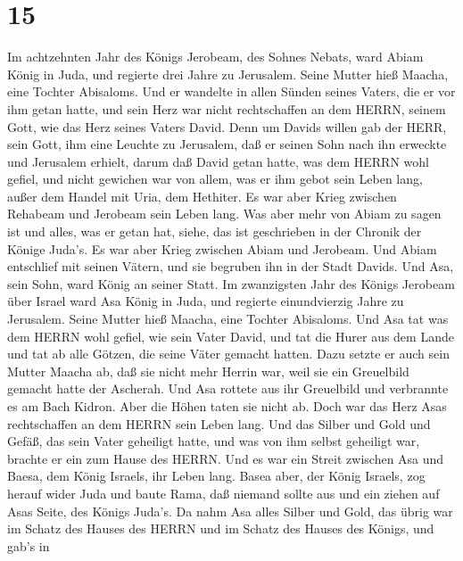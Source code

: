 \hypertarget{section-14}{%
\section{15}\label{section-14}}

 Im achtzehnten Jahr des Königs Jerobeam, des Sohnes Nebats,
ward Abiam König in Juda,  und regierte drei Jahre zu
Jerusalem. Seine Mutter hieß Maacha, eine Tochter Abisaloms.
 Und er wandelte in allen Sünden seines Vaters, die er vor
ihm getan hatte, und sein Herz war nicht rechtschaffen an dem HERRN,
seinem Gott, wie das Herz seines Vaters David.  Denn um
Davids willen gab der HERR, sein Gott, ihm eine Leuchte zu Jerusalem,
daß er seinen Sohn nach ihn erweckte und Jerusalem erhielt, 
darum daß David getan hatte, was dem HERRN wohl gefiel, und nicht
gewichen war von allem, was er ihm gebot sein Leben lang, außer dem
Handel mit Uria, dem Hethiter.  Es war aber Krieg zwischen
Rehabeam und Jerobeam sein Leben lang.  Was aber mehr von
Abiam zu sagen ist und alles, was er getan hat, siehe, das ist
geschrieben in der Chronik der Könige Juda's. Es war aber Krieg zwischen
Abiam und Jerobeam.  Und Abiam entschlief mit seinen Vätern,
und sie begruben ihn in der Stadt Davids. Und Asa, sein Sohn, ward König
an seiner Statt.  Im zwanzigsten Jahr des Königs Jerobeam
über Israel ward Asa König in Juda,  und regierte
einundvierzig Jahre zu Jerusalem. Seine Mutter hieß Maacha, eine Tochter
Abisaloms.  Und Asa tat was dem HERRN wohl gefiel, wie sein
Vater David,  und tat die Hurer aus dem Lande und tat ab
alle Götzen, die seine Väter gemacht hatten.  Dazu setzte
er auch sein Mutter Maacha ab, daß sie nicht mehr Herrin war, weil sie
ein Greuelbild gemacht hatte der Ascherah. Und Asa rottete aus ihr
Greuelbild und verbrannte es am Bach Kidron.  Aber die
Höhen taten sie nicht ab. Doch war das Herz Asas rechtschaffen an dem
HERRN sein Leben lang.  Und das Silber und Gold und Gefäß,
das sein Vater geheiligt hatte, und was von ihm selbst geheiligt war,
brachte er ein zum Hause des HERRN.  Und es war ein Streit
zwischen Asa und Baesa, dem König Israels, ihr Leben lang. 
Basea aber, der König Israels, zog herauf wider Juda und baute Rama, daß
niemand sollte aus und ein ziehen auf Asas Seite, des Königs Juda's.
 Da nahm Asa alles Silber und Gold, das übrig war im Schatz
des Hauses des HERRN und im Schatz des Hauses des Königs, und gab's in

